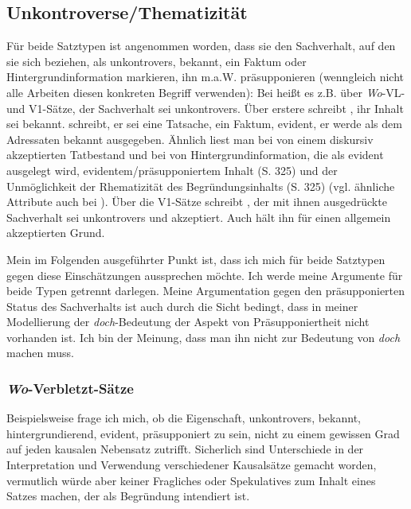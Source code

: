{\subsection{Unkontroverse/Thematizität}
\label{sec:unkontr}
Für beide Satztypen ist angenommen worden, dass sie den Sachverhalt, auf den sie sich beziehen, als unkontrovers, bekannt, ein Faktum oder Hintergrundinformation markieren,  ihn m.a.W. präsupponieren  (wenngleich nicht alle Arbeiten diesen konkreten Begriff verwenden): Bei \citet[90]{Kwon2005} heißt es z.B. über \textit{Wo}-VL- und V1-Sätze, der Sachverhalt sei unkontrovers. Über erstere schreibt \citet[43]{Winkler1992}, ihr Inhalt sei bekannt. \citet[145]{Pasch1999} schreibt, er sei eine Tatsache, ein Faktum, evident, er werde als dem Adressaten bekannt ausgegeben. Ähnlich liest man bei \citet[236]{Eroms2000} von einem \glqq diskursiv akzeptierten Tatbestand\grqq{} und bei \citet[315]{Guenthner2002} von Hintergrundinformation, die als evident ausgelegt wird, evidentem/präsupponiertem Inhalt (S. 325) und der Unmöglichkeit der Rhematizität des Begründungsinhalts (S. 325) (vgl. ähnliche Attribute auch bei \citealt[134, 135, 148]{Guenthner2007}). Über die V1-Sätze schreibt \citet[1020]{Altmann1993}, der mit ihnen ausgedrückte Sachverhalt sei unkontrovers und akzeptiert. Auch \citet[171]{Pittner2011} hält ihn für einen allgemein akzeptierten Grund.

Mein im Folgenden ausgeführter Punkt ist, dass ich mich für beide Satztypen gegen diese Einschätzungen aussprechen möchte. Ich werde meine Argumente für beide Typen getrennt darlegen. Meine Argumentation gegen den präsupponierten Status des Sachverhalts ist auch durch die Sicht bedingt, dass in meiner Modellierung der \textit{doch}-Bedeutung der Aspekt von Präsupponiertheit nicht vorhanden ist. Ich bin der Meinung, dass man ihn nicht zur Bedeutung von \textit{doch} machen muss. 

\subsubsection{\textit{Wo}-Verbletzt-Sätze}
Beispielsweise frage ich mich, ob die Eigenschaft, unkontrovers, bekannt, hintergrundierend, evident, präsupponiert zu sein, nicht zu einem gewissen Grad auf jeden kausalen Nebensatz zutrifft. Sicherlich sind Unterschiede in der Interpretation und Verwendung verschiedener Kausalsätze gemacht worden, vermutlich würde aber keiner Fragliches oder Spekulatives zum Inhalt eines Satzes machen, der als Begründung intendiert ist.

}
